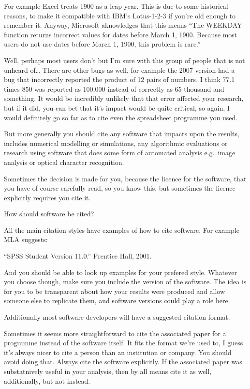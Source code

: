 \documentclass[]{article}
\begin{document}
For example Excel treats 1900 as a leap year. This is due to some
historical reasons, to make it compatible with IBM's Lotus-1-2-3 if
you're old enough to remember it. Anyway, Microsoft aknowledges that
this means ``The WEEKDAY function returns incorrect values for dates
before March 1, 1900. Because most users do not use dates before March
1, 1900, this problem is rare.''

Well, perhaps most users don't but I'm sure with this group of people
that is not unheard of\ldots{} There are other bugs as well, for example
the 2007 version had a bug that incorrectly reported the product of 12
pairs of numbers. I think 77.1 times 850 was reported as 100,000 instead
of correctly as 65 thousand and something. It would be incredibly
unlikely that that error affected your research, but if it did, you can
bet that it's impact would be quite critical, so again, I would
definitely go so far as to cite even the spreadsheet programme you used.

But more generally you should cite any software that impacts upon the
results, includes numerical modelling or simulations, any algorithmic
evaluations or research using software that does some form of automated
analysis e.g.~image analysis or optical character recognition.

Sometimes the decision is made for you, because the licence for the
software, that you have of course carefully read, so you know this, but
sometimes the licence explicitly requires you cite it.

How should software be cited?

All the main citation styles have examples of how to cite software. For
example MLA suggests:

``SPSS Student Version 11.0.'' Prentice Hall, 2001.

And you should be able to look up examples for your prefered style.
Whatever you choose though, make sure you include the version of the
software. The idea is for you to be transparent about how your results
were produced and allow someone else to replicate them, and software
versions could play a role here.

Additionally most software developers will have a suggested citation
format.

Sometimes it seems more straightforward to cite the associated paper for
a programme instead of the software itself. It fits the format we're
used to, I guess it's always nicer to cite a person than an institution
or company. You should avoid doing that. Always cite the software
explicitly. If the associated paper was substatnively useful in your
analysis, then by all means cite it as well, additionally, but not
instead.
\end{document}
